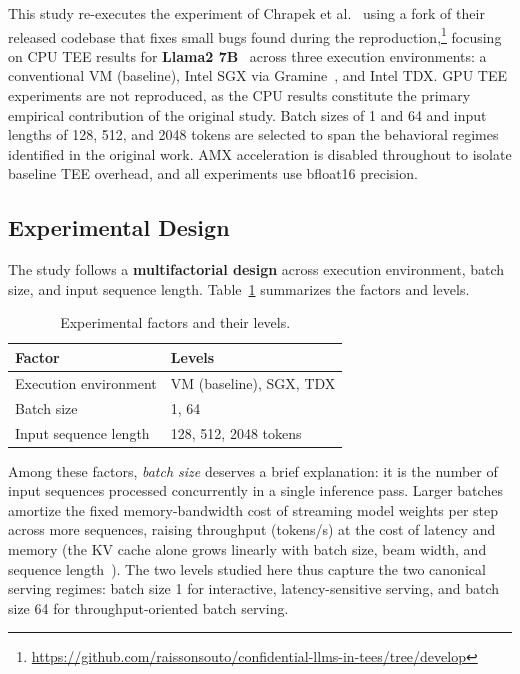 \documentclass[sigconf]{acmart}
\begin{document}
This study re-executes the experiment of Chrapek et al.~\cite{chrapek2025confidential}
using a fork of their released codebase that fixes small bugs found during the
reproduction,\footnote{\url{https://github.com/raissonsouto/confidential-llms-in-tees/tree/develop}}
focusing on CPU TEE results for \textbf{Llama2 7B}~\cite{llama2}
across three execution environments: a conventional VM (baseline), Intel SGX via
Gramine~\cite{gramine}, and Intel TDX. GPU TEE experiments are not reproduced, as the
CPU results constitute the primary empirical contribution of the original study. Batch
sizes of 1 and 64 and input lengths of 128, 512, and 2048 tokens are selected to span
the behavioral regimes identified in the original work. AMX acceleration is disabled
throughout to isolate baseline TEE overhead, and all experiments use bfloat16 precision.

\subsection{Experimental Design}

The study follows a \textbf{multifactorial design} across execution environment, batch
size, and input sequence length. Table~\ref{tab:factors} summarizes the factors and levels.

\begin{table}[t]
  \caption{Experimental factors and their levels.}
  \label{tab:factors}
  \begin{tabular}{ll}
    \toprule
    \textbf{Factor} & \textbf{Levels} \\
    \midrule
    Execution environment & VM (baseline), SGX, TDX \\
    Batch size            & 1, 64 \\
    Input sequence length & 128, 512, 2048 tokens \\
    \bottomrule
  \end{tabular}
\end{table}

Among these factors, \emph{batch size} deserves a brief explanation: it is the number
of input sequences processed concurrently in a single inference pass. Larger batches
amortize the fixed memory-bandwidth cost of streaming model weights per step across
more sequences, raising throughput (tokens/s) at the cost of latency and memory
(the KV cache alone grows linearly with batch size, beam width, and sequence
length~\cite{vllm}). The two levels studied here thus capture the two canonical
serving regimes: batch size 1 for interactive, latency-sensitive serving, and batch
size 64 for throughput-oriented batch serving.
\end{document}

